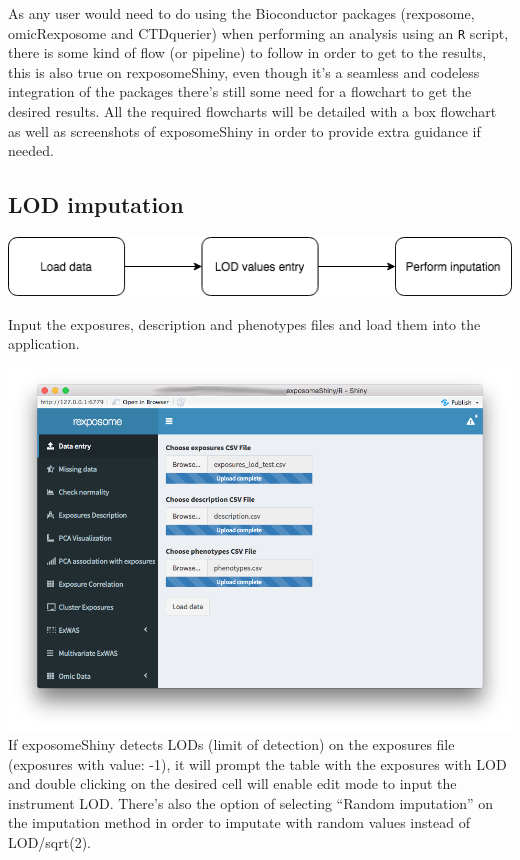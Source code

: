 \documentclass[
]{book}
\begin{document}
As any user would need to do using the Bioconductor packages (rexposome, omicRexposome and CTDquerier) when performing an analysis using an \texttt{R} script, there is some kind of flow (or pipeline) to follow in order to get to the results, this is also true on rexposomeShiny, even though it's a seamless and codeless integration of the packages there's still some need for a flowchart to get the desired results. All the required flowcharts will be detailed with a box flowchart as well as screenshots of exposomeShiny in order to provide extra guidance if needed.

\hypertarget{lod-imputation}{%
\subsection{LOD imputation}\label{lod-imputation}}

\includegraphics{images/analysis1_1.png}

Input the exposures, description and phenotypes files and load them into the application.

\includegraphics{images/analysis1_2.png}
If exposomeShiny detects LODs (limit of detection) on the exposures file (exposures with value: -1), it will prompt the table with the exposures with LOD and double clicking on the desired cell will enable edit mode to input the instrument LOD. There's also the option of selecting ``Random imputation'' on the imputation method in order to imputate with random values instead of LOD/sqrt(2).
\end{document}
